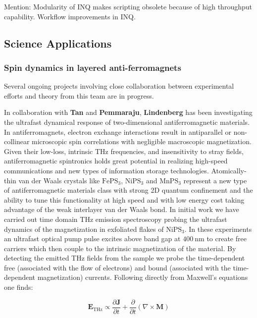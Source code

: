Mention: Modularity of INQ makes scripting obsolete because of high throughput capability. Workflow improvements in INQ.

\subsection{Science Applications}
\subsubsection{Spin dynamics in layered anti-ferromagnets}
Several ongoing projects involving close collaboration between experimental efforts and theory from this team are in progress.

In collaboration with {\bf Tan} and {\bf Pemmaraju}, {\bf Lindenberg} has been investigating the ultrafast dynamical response of two-dimensional antiferromagnetic materials.
In antiferromagnets, electron exchange interactions result in antiparallel or non-collinear microscopic spin correlations with negligible macroscopic magnetization.
Given their low-loss, intrinsic THz frequencies, and insensitivity to stray fields, antiferromagnetic spintronics holds great potential in realizing high-speed communications and new types of information storage technologies. 
Atomically-thin van der Waals crystals like \(\mathrm{FePS_3}\), \(\mathrm{NiPS_3}\) and \(\mathrm{MnPS_3}\) represent a new type of antiferromagnetic materials class with strong 2D quantum confinement and the ability to tune this functionality at high speed and with low energy cost taking advantage of the weak interlayer van der Waals bond.
In initial work we have carried out time domain THz emission spectroscopy probing the ultrafast dynamics of the magnetization in exfoliated flakes of \(\mathrm{NiPS_3}\).
In these experiments an ultrafast optical pump pulse excites above band gap at \(400~\mathrm{nm}\) to create free carriers which then couple to the intrinsic magnetization of the material.
By detecting the emitted THz fields from the sample we probe the time-dependent free (associated with the flow of electrons) and bound (associated with the time-dependent magnetization) currents.  Following directly from Maxwell’s equations one finds: 

\begin{equation}
\mathbf{E}_\text{THz} \propto \frac{\partial\mathbf{J}}{\partial t}+ \frac{\partial}{\partial t} (\nabla \times \mathbf{M})
\end{equation}

